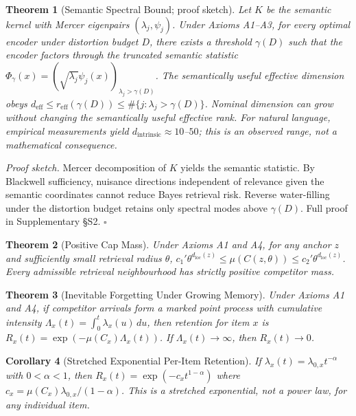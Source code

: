 \documentclass[11pt]{article}
\newtheorem{theorem}{Theorem}
\newtheorem{corollary}[theorem]{Corollary}
\begin{document}
\begin{theorem}[Semantic Spectral Bound; proof sketch]
\label{thm:dim}
Let $K$ be the semantic kernel with Mercer eigenpairs $(\lambda_j, \psi_j)$. Under Axioms A1--A3, for every optimal encoder under distortion budget $D$, there exists a threshold $\gamma(D)$ such that the encoder factors through the truncated semantic statistic $\Phi_\gamma(x) = (\sqrt{\lambda_j}\psi_j(x))_{\lambda_j > \gamma(D)}$. The semantically useful effective dimension obeys $d_{\mathrm{eff}} \le r_{\mathrm{eff}}(\gamma(D)) \le \#\{j: \lambda_j > \gamma(D)\}$. Nominal dimension can grow without changing the semantically useful effective rank. For natural language, empirical measurements yield $d_{\mathrm{intrinsic}} \approx 10$--$50$\cite{levina2005}; this is an observed range, not a mathematical consequence.
\end{theorem}

\noindent\textit{Proof sketch.} Mercer decomposition of $K$ yields the semantic statistic. By Blackwell sufficiency, nuisance directions independent of relevance given the semantic coordinates cannot reduce Bayes retrieval risk. Reverse water-filling under the distortion budget retains only spectral modes above $\gamma(D)$. Full proof in Supplementary \S S2. $\square$

\begin{theorem}[Positive Cap Mass]
\label{thm:capmass}
Under Axioms A1 and A4, for any anchor $z$ and sufficiently small retrieval radius $\theta$, $c_1' \theta^{d_{\mathrm{loc}}(z)} \le \mu(C(z,\theta)) \le c_2' \theta^{d_{\mathrm{loc}}(z)}$. Every admissible retrieval neighbourhood has strictly positive competitor mass.
\end{theorem}

\begin{theorem}[Inevitable Forgetting Under Growing Memory]
\label{thm:forgetting}
Under Axioms A1 and A4, if competitor arrivals form a marked point process with cumulative intensity $\Lambda_x(t) = \int_0^t \lambda_x(u)\,du$, then retention for item $x$ is $R_x(t) = \exp(-\mu(C_x)\Lambda_x(t))$. If $\Lambda_x(t) \to \infty$, then $R_x(t) \to 0$.
\end{theorem}

\begin{corollary}[Stretched Exponential Per-Item Retention]
\label{cor:stretched}
If $\lambda_x(t) = \lambda_{0,x} t^{-\alpha}$ with $0 < \alpha < 1$, then $R_x(t) = \exp(-c_x t^{1-\alpha})$ where $c_x = \mu(C_x)\lambda_{0,x}/(1-\alpha)$. This is a stretched exponential, not a power law, for any individual item.
\end{corollary}
\end{document}
